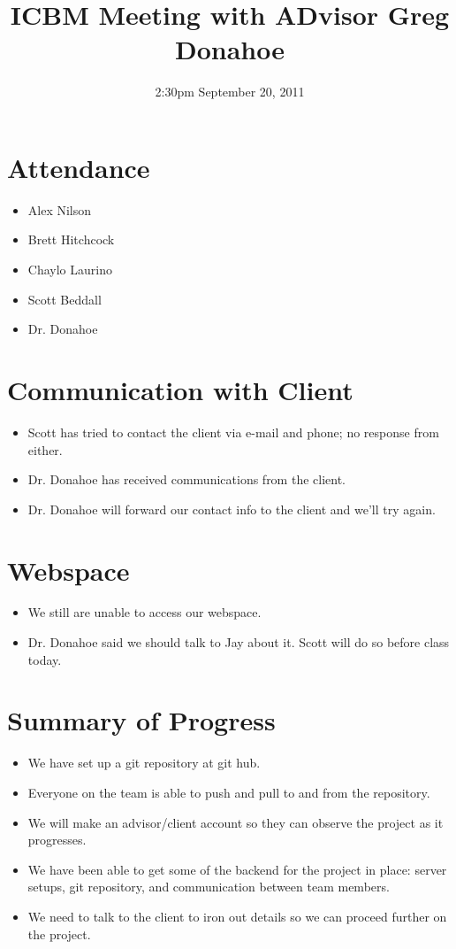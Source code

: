 \documentclass{article}
\begin{document}
\title{ICBM Meeting with ADvisor Greg Donahoe}
\date{2:30pm September 20, 2011}
\maketitle

\section{Attendance}
\begin{itemize}
\item Alex Nilson
\item Brett Hitchcock
\item Chaylo Laurino
\item Scott Beddall
\item Dr. Donahoe
\end{itemize}

\section{Communication with Client}
\begin{itemize}
\item Scott has tried to contact the client via e-mail and phone; no response from either.
\item Dr. Donahoe has received communications from the client.
\item Dr. Donahoe will forward our contact info to the client and we'll try again.
\end{itemize}


\section{Webspace}
\begin{itemize}
\item We still are unable to access our webspace.
\item Dr. Donahoe said we should talk to Jay about it.  Scott will do so before class today.
\end{itemize}

\section{Summary of Progress}
\begin{itemize}
\item We have set up a git repository at git hub.
\item Everyone on the team is able to push and pull to and from the repository.
\item We will make an advisor/client account so they can observe the project as it progresses.
\item We have been able to get some of the backend for the project in place: server setups, git repository, and communication between team members.
\item We need to talk to the client to iron out details so we can proceed further on the project.
\end{itemize}
\end{document}
